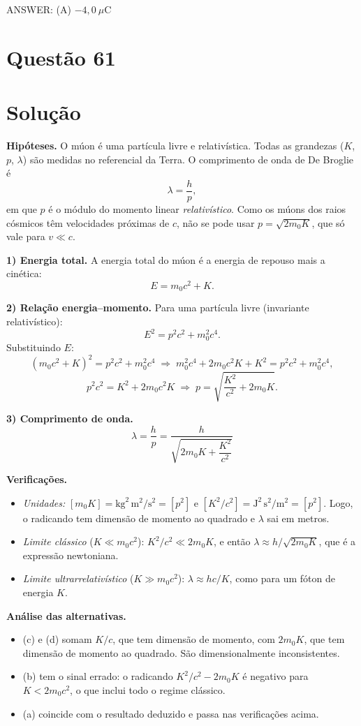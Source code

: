 \documentclass{article}%
\begin{document}
ANSWER: (A) $-4{,}0\ \mu\text{C}$%
\newpage%
\section*{Questão 61}

\section*{Solução}

\textbf{Hipóteses.} O múon é uma partícula livre e relativística. Todas as grandezas ($K$, $p$, $\lambda$) são medidas no referencial da Terra. O comprimento de onda de De Broglie é
\[
\lambda=\frac{h}{p},
\]
em que $p$ é o módulo do momento linear \emph{relativístico}. Como os múons dos raios cósmicos têm velocidades próximas de $c$, não se pode usar $p=\sqrt{2m_0K}$, que só vale para $v\ll c$.

\textbf{1) Energia total.} A energia total do múon é a energia de repouso mais a cinética:
\[
E = m_0c^2 + K .
\]

\textbf{2) Relação energia--momento.} Para uma partícula livre (invariante relativístico):
\[
E^2 = p^2c^2 + m_0^2c^4 .
\]
Substituindo $E$:
\[
\left(m_0c^2+K\right)^2 = p^2c^2 + m_0^2c^4
\;\Longrightarrow\;
m_0^2c^4 + 2m_0c^2K + K^2 = p^2c^2 + m_0^2c^4 ,
\]
\[
p^2c^2 = K^2 + 2m_0c^2K
\;\Longrightarrow\;
p=\sqrt{\frac{K^2}{c^2}+2m_0K}.
\]

\textbf{3) Comprimento de onda.}
\[
\boxed{\lambda=\frac{h}{p}=\frac{h}{\sqrt{2m_0K+\dfrac{K^2}{c^2}}}}
\]

\textbf{Verificações.}
\begin{itemize}
\item \emph{Unidades:} $[m_0K]=\text{kg}^2\,\text{m}^2/\text{s}^2=[p^2]$ e $[K^2/c^2]=\text{J}^2\,\text{s}^2/\text{m}^2=[p^2]$. Logo, o radicando tem dimensão de momento ao quadrado e $\lambda$ sai em metros.
\item \emph{Limite clássico} ($K\ll m_0c^2$): $K^2/c^2\ll 2m_0K$, e então $\lambda\approx h/\sqrt{2m_0K}$, que é a expressão newtoniana.
\item \emph{Limite ultrarrelativístico} ($K\gg m_0c^2$): $\lambda\approx hc/K$, como para um fóton de energia $K$.
\end{itemize}

\textbf{Análise das alternativas.}
\begin{itemize}
\item (c) e (d) somam $K/c$, que tem dimensão de momento, com $2m_0K$, que tem dimensão de momento ao quadrado. São dimensionalmente inconsistentes.
\item (b) tem o sinal errado: o radicando $K^2/c^2-2m_0K$ é negativo para $K<2m_0c^2$, o que inclui todo o regime clássico.
\item (a) coincide com o resultado deduzido e passa nas verificações acima.
\end{itemize}
\end{document}
